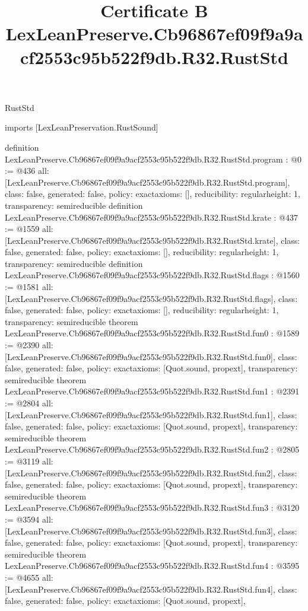 \begin{lexlean}{RustStd}
\title{Certificate B LexLeanPreserve.Cb96867ef09f9a9acf2553c95b522f9db.R32.RustStd}
\begin{coremodule}
imports [LexLeanPreservation.RustSound]

definition LexLeanPreserve.Cb96867ef09f9a9acf2553c95b522f9db.R32.RustStd.program : @0 := @436 {
  all: [LexLeanPreserve.Cb96867ef09f9a9acf2553c95b522f9db.R32.RustStd.program],
  class: false,
  generated: false,
  policy: exact{axioms: []},
  reducibility: regular{height: 1},
  transparency: semireducible
}
definition LexLeanPreserve.Cb96867ef09f9a9acf2553c95b522f9db.R32.RustStd.krate : @437 := @1559 {
  all: [LexLeanPreserve.Cb96867ef09f9a9acf2553c95b522f9db.R32.RustStd.krate],
  class: false,
  generated: false,
  policy: exact{axioms: []},
  reducibility: regular{height: 1},
  transparency: semireducible
}
definition LexLeanPreserve.Cb96867ef09f9a9acf2553c95b522f9db.R32.RustStd.flags : @1560 := @1581 {
  all: [LexLeanPreserve.Cb96867ef09f9a9acf2553c95b522f9db.R32.RustStd.flags],
  class: false,
  generated: false,
  policy: exact{axioms: []},
  reducibility: regular{height: 1},
  transparency: semireducible
}
theorem LexLeanPreserve.Cb96867ef09f9a9acf2553c95b522f9db.R32.RustStd.fun0 : @1589 := @2390 {
  all: [LexLeanPreserve.Cb96867ef09f9a9acf2553c95b522f9db.R32.RustStd.fun0],
  class: false,
  generated: false,
  policy: exact{axioms: [Quot.sound, propext]},
  transparency: semireducible
}
theorem LexLeanPreserve.Cb96867ef09f9a9acf2553c95b522f9db.R32.RustStd.fun1 : @2391 := @2804 {
  all: [LexLeanPreserve.Cb96867ef09f9a9acf2553c95b522f9db.R32.RustStd.fun1],
  class: false,
  generated: false,
  policy: exact{axioms: [Quot.sound, propext]},
  transparency: semireducible
}
theorem LexLeanPreserve.Cb96867ef09f9a9acf2553c95b522f9db.R32.RustStd.fun2 : @2805 := @3119 {
  all: [LexLeanPreserve.Cb96867ef09f9a9acf2553c95b522f9db.R32.RustStd.fun2],
  class: false,
  generated: false,
  policy: exact{axioms: [Quot.sound, propext]},
  transparency: semireducible
}
theorem LexLeanPreserve.Cb96867ef09f9a9acf2553c95b522f9db.R32.RustStd.fun3 : @3120 := @3594 {
  all: [LexLeanPreserve.Cb96867ef09f9a9acf2553c95b522f9db.R32.RustStd.fun3],
  class: false,
  generated: false,
  policy: exact{axioms: [Quot.sound, propext]},
  transparency: semireducible
}
theorem LexLeanPreserve.Cb96867ef09f9a9acf2553c95b522f9db.R32.RustStd.fun4 : @3595 := @4655 {
  all: [LexLeanPreserve.Cb96867ef09f9a9acf2553c95b522f9db.R32.RustStd.fun4],
  class: false,
  generated: false,
  policy: exact{axioms: [Quot.sound, propext]},
}
\end{coremodule}
\end{lexlean}
